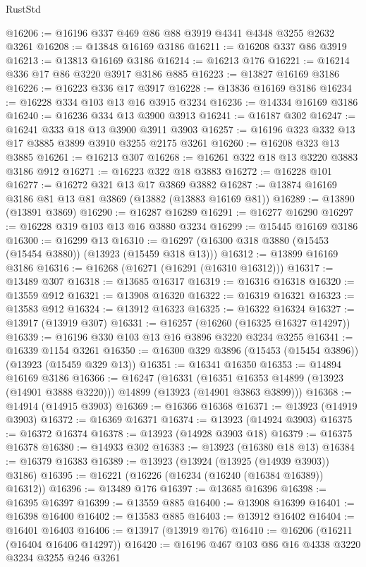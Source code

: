\begin{lexlean}{RustStd}
\begin{coremodule}
{\begin{coremodule}
{{{{{{{{{{{{{{{{{{{{{{{{{{{{{{{{{{{{{@16206 := @16196 @337 @469 @86 @88 @3919 @4341 @4348 @3255 @2632 @3261
@16208 := @13848 @16169 @3186
@16211 := @16208 @337 @86 @3919
@16213 := @13813 @16169 @3186
@16214 := @16213 @176
@16221 := @16214 @336 @17 @86 @3220 @3917 @3186 @885
@16223 := @13827 @16169 @3186
@16226 := @16223 @336 @17 @3917
@16228 := @13836 @16169 @3186
@16234 := @16228 @334 @103 @13 @16 @3915 @3234
@16236 := @14334 @16169 @3186
@16240 := @16236 @334 @13 @3900 @3913
@16241 := @16187 @302
@16247 := @16241 @333 @18 @13 @3900 @3911 @3903
@16257 := @16196 @323 @332 @13 @17 @3885 @3899 @3910 @3255 @2175 @3261
@16260 := @16208 @323 @13 @3885
@16261 := @16213 @307
@16268 := @16261 @322 @18 @13 @3220 @3883 @3186 @912
@16271 := @16223 @322 @18 @3883
@16272 := @16228 @101
@16277 := @16272 @321 @13 @17 @3869 @3882
@16287 := @13874 @16169 @3186 @81 @13 @81 @3869 (@13882 (@13883 @16169 @81))
@16289 := @13890 (@13891 @3869)
@16290 := @16287 @16289
@16291 := @16277 @16290
@16297 := @16228 @319 @103 @13 @16 @3880 @3234
@16299 := @15445 @16169 @3186
@16300 := @16299 @13
@16310 := @16297 (@16300 @318 @3880 (@15453 (@15454 @3880)) (@13923 (@15459 @318 @13)))
@16312 := @13899 @16169 @3186
@16316 := @16268 (@16271 (@16291 (@16310 @16312)))
@16317 := @13489 @307
@16318 := @13685 @16317
@16319 := @16316 @16318
@16320 := @13559 @912
@16321 := @13908 @16320
@16322 := @16319 @16321
@16323 := @13583 @912
@16324 := @13912 @16323
@16325 := @16322 @16324
@16327 := @13917 (@13919 @307)
@16331 := @16257 (@16260 (@16325 @16327 @14297))
@16339 := @16196 @330 @103 @13 @16 @3896 @3220 @3234 @3255
@16341 := @16339 @1154 @3261
@16350 := @16300 @329 @3896 (@15453 (@15454 @3896)) (@13923 (@15459 @329 @13))
@16351 := @16341 @16350
@16353 := @14894 @16169 @3186
@16366 := @16247
    (@16331
      (@16351 @16353 @14899 (@13923 (@14901 @3888 @3220)))
      @14899
      (@13923 (@14901 @3863 @3899)))
@16368 := @14914 (@14915 @3903)
@16369 := @16366 @16368
@16371 := @13923 (@14919 @3903)
@16372 := @16369 @16371
@16374 := @13923 (@14924 @3903)
@16375 := @16372 @16374
@16378 := @13923 (@14928 @3903 @18)
@16379 := @16375 @16378
@16380 := @14933 @302
@16383 := @13923 (@16380 @18 @13)
@16384 := @16379 @16383
@16389 := @13923 (@13924 (@13925 (@14939 @3903)) @3186)
@16395 := @16221 (@16226 (@16234 (@16240 (@16384 @16389)) @16312))
@16396 := @13489 @176
@16397 := @13685 @16396
@16398 := @16395 @16397
@16399 := @13559 @885
@16400 := @13908 @16399
@16401 := @16398 @16400
@16402 := @13583 @885
@16403 := @13912 @16402
@16404 := @16401 @16403
@16406 := @13917 (@13919 @176)
@16410 := @16206 (@16211 (@16404 @16406 @14297))
@16420 := @16196 @467 @103 @86 @16 @4338 @3220 @3234 @3255 @246 @3261
}}}}}}}}}}}}}}}}}}}}}}}}}}}}}}}}}}}}}
\end{coremodule}}
\end{coremodule}
\end{lexlean}
